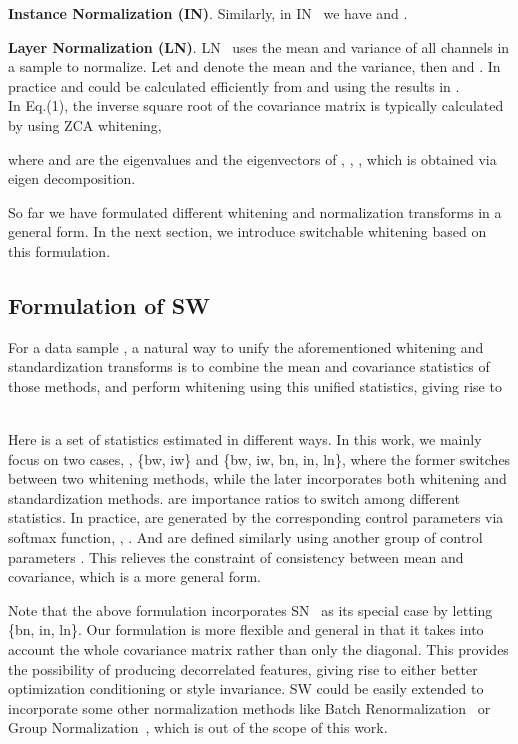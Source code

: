 \documentclass[10pt,twocolumn,letterpaper]{article}
\begin{document}
\textbf{Instance Normalization (IN)}.
Similarly, in IN~\cite{ulyanov2017improved} we have  and .

\textbf{Layer Normalization (LN)}.
LN~\cite{ba2016layer} uses the mean and variance of all channels in a sample to normalize.
Let  and  denote the mean and the variance, 
then  and .
In practice  and  could be calculated efficiently from  and  using the results in \cite{luo2018differentiable}.
~\\



In Eq.(1), the inverse square root of the covariance matrix is typically calculated by using ZCA whitening,

where  and  are the eigenvalues and the eigenvectors of , \ie, , which is obtained via eigen decomposition.

So far we have formulated different whitening and normalization transforms in a general form.
In the next section, we introduce switchable whitening based on this formulation.

\subsection{Formulation of SW}

For a data sample , a natural way to unify the aforementioned whitening and standardization transforms is to combine the mean and covariance statistics of those methods, and perform whitening using this unified statistics, giving rise to
~\\

\begin{fleqn}

\end{fleqn}
Here  is a set of statistics estimated in different ways.
In this work, we mainly focus on two cases, \ie,  \{bw, iw\} and  \{bw, iw, bn, in, ln\}, where the former switches between two whitening methods, while the later incorporates both whitening and standardization methods.
 are importance ratios to switch among different statistics.
In practice,  are generated by the corresponding control parameters  via softmax function, \ie, .
And  are defined similarly using another group of control parameters .
This relieves the constraint of consistency between mean and covariance, which is a more general form.

Note that the above formulation incorporates SN~\cite{luo2018differentiable} as its special case by letting  \{bn, in, ln\}.
Our formulation is more flexible and general in that it takes into account the whole covariance matrix rather than only the diagonal.
This provides the possibility of producing decorrelated features, giving rise to either better optimization conditioning or style invariance.
SW could be easily extended to incorporate some other normalization methods like Batch Renormalization~\cite{ioffe2017batch} or Group Normalization~\cite{wu2018group}, which is out of the scope of this work.
\end{document}
